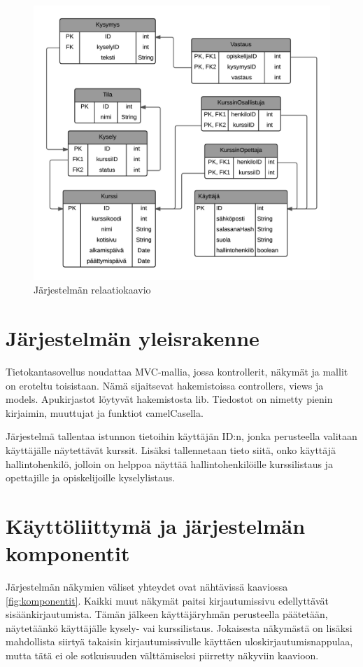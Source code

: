 \documentclass[12pt,a4paper,titlepage]{article}
\begin{document}
\begin{figure}
   \centering
   \includegraphics[width=\textwidth]{kuvat/relaatiokaavio-pysty.png}
   \caption{Järjestelmän relaatiokaavio}\label{fig:relaatiokaavio}
\end{figure}

\section{Järjestelmän yleisrakenne}
Tietokantasovellus noudattaa MVC-mallia, jossa kontrollerit, näkymät ja mallit on eroteltu toisistaan. Nämä sijaitsevat hakemistoissa controllers, views ja models. Apukirjastot löytyvät hakemistosta lib. Tiedostot on nimetty pienin kirjaimin, muuttujat ja funktiot camelCasella.

Järjestelmä tallentaa istunnon tietoihin käyttäjän ID:n, jonka perusteella valitaan käyttäjälle näytettävät kurssit. Lisäksi tallennetaan tieto siitä, onko käyttäjä hallintohenkilö, jolloin on helppoa näyttää hallintohenkilöille kurssilistaus ja opettajille ja opiskelijoille kyselylistaus.

\section{Käyttöliittymä ja järjestelmän komponentit}
Järjestelmän näkymien väliset yhteydet ovat nähtävissä kaaviossa \ref{fig:komponentit}. Kaikki muut näkymät paitsi kirjautumissivu edellyttävät sisäänkirjautumista. Tämän jälkeen käyttäjäryhmän perusteella päätetään, näytetäänkö käyttäjälle kysely- vai kurssilistaus. Jokaisesta näkymästä on lisäksi mahdollista siirtyä takaisin kirjautumissivulle käyttäen uloskirjautumisnappulaa, mutta tätä ei ole sotkuisuuden välttämiseksi piirretty näkyviin kaavioon.
\end{document}
